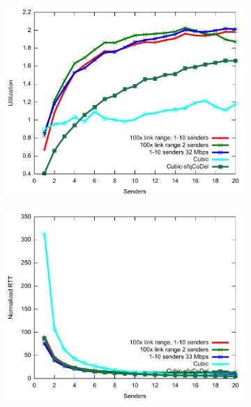 \begin{figure}
\centering
\begin{subfigure}[b]{0.33\textwidth}
\includegraphics[width=\textwidth]{figures/muxing-robust-tpt.pdf}
\end{subfigure}
\begin{subfigure}[b]{0.33\textwidth}
\includegraphics[width=\textwidth]{figures/muxing-robust-delay.pdf}
\end{subfigure}
\begin{subfigure}[b]{0.33\textwidth}

\end{subfigure}
\end{figure}
